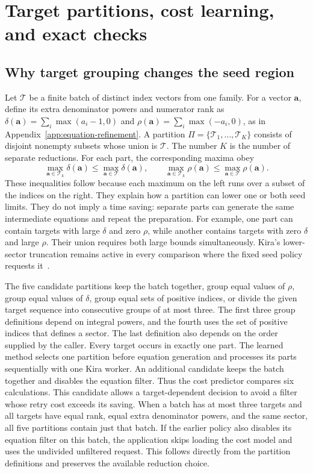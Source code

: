 \section{Target partitions, cost learning, and exact checks}
\label{app:batch-policy}
\subsection{Why target grouping changes the seed region}
Let $\mathcal T$ be a finite batch of distinct index vectors from one family.
For a vector $\boldsymbol a$, define its extra denominator powers and numerator
rank as $\delta(\boldsymbol a)=\sum_i\max(a_i-1,0)$ and
$\rho(\boldsymbol a)=\sum_i\max(-a_i,0)$, as in
Appendix~\ref{app:equation-refinement}. A partition
$\Pi=\{\mathcal T_1,\ldots,\mathcal T_K\}$ consists of disjoint nonempty
subsets whose union is $\mathcal T$. The number $K$ is the number of separate
reductions. For each part, the corresponding maxima obey
\begin{equation}
 \max_{\boldsymbol a\in\mathcal T_k}\delta(\boldsymbol a)
 \leq\max_{\boldsymbol a\in\mathcal T}\delta(\boldsymbol a),\qquad
 \max_{\boldsymbol a\in\mathcal T_k}\rho(\boldsymbol a)
 \leq\max_{\boldsymbol a\in\mathcal T}\rho(\boldsymbol a).
 \label{eq:batch-maxima}
\end{equation}
These inequalities follow because each maximum on the left runs over a
subset of the indices on the right. They explain how a partition can lower
one or both seed limits. They do not imply a time saving: separate parts can
generate the same intermediate equations and repeat the preparation.
For example, one part can contain targets with large $\delta$ and zero
$\rho$, while another contains targets with zero $\delta$ and large $\rho$.
Their union requires both large bounds simultaneously. Kira's lower-sector
truncation remains active in every comparison where the fixed seed policy
requests it~\cite{Kira3}.

The five candidate partitions keep the batch together, group equal values of
$\rho$, group equal values of $\delta$, group equal sets of positive indices,
or divide the given target sequence into consecutive groups of at most three.
The first three group definitions depend on integral powers, and the fourth
uses the set of positive indices that defines a sector. The last definition
also depends on the order supplied by the caller. Every target occurs in
exactly one part. The learned method selects one partition before equation
generation and processes its parts sequentially with one Kira worker.
An additional candidate keeps the batch together and disables the equation
filter. Thus the cost predictor compares six calculations. This candidate
allows a target-dependent decision to avoid a filter whose retry cost exceeds
its saving.
When a batch has at most three targets and all targets have equal rank,
equal extra denominator powers, and the same sector, all five partitions
contain just that batch. If the earlier policy also disables its equation
filter on this batch, the application skips loading the cost model and uses
the undivided unfiltered request. This follows directly from the partition
definitions and preserves the available reduction choice.

